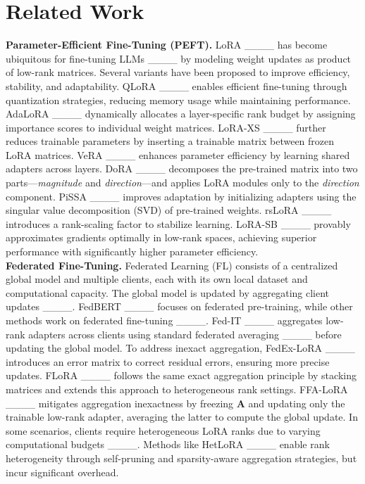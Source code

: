 \section{Related Work}
\textbf{Parameter-Efficient Fine-Tuning (PEFT).}  
LoRA ____ has become ubiquitous for fine-tuning LLMs ____ by modeling weight updates as product of low-rank matrices. 
Several variants have been proposed to improve efficiency, stability, and adaptability.  
QLoRA ____ enables efficient fine-tuning through quantization strategies, reducing memory usage while maintaining performance.  
AdaLoRA ____ dynamically allocates a layer-specific rank budget by assigning importance scores to individual weight matrices.  
LoRA-XS ____ further reduces trainable parameters by inserting a trainable matrix between frozen LoRA matrices.  
VeRA ____ enhances parameter efficiency by learning shared adapters across layers.  
DoRA ____ decomposes the pre-trained matrix into two parts—\textit{magnitude} and \textit{direction}—and applies LoRA modules only to the \textit{direction} component.  
PiSSA ____ improves adaptation by initializing adapters using the singular value decomposition (SVD) of pre-trained weights.  
rsLoRA ____ introduces a rank-scaling factor to stabilize learning.  
LoRA-SB ____ provably approximates gradients optimally in low-rank spaces, achieving superior performance with significantly higher parameter efficiency.
\\

\textbf{Federated Fine-Tuning.}
Federated Learning (FL) consists of a centralized global model and multiple clients, each with its own local dataset and computational capacity. 
The global model is updated by aggregating client updates ____.  
FedBERT ____ focuses on federated pre-training, while other methods work on federated fine-tuning ____.  
Fed-IT ____ aggregates low-rank adapters across clients using standard federated averaging ____ before updating the global model.  
To address inexact aggregation, FedEx-LoRA ____ introduces an error matrix to correct residual errors, ensuring more precise updates.  
FLoRA ____ follows the same exact aggregation principle by stacking matrices and extends this approach to heterogeneous rank settings.  
FFA-LoRA ____ mitigates aggregation inexactness by freezing \( \mathbf{A} \) and updating only the trainable low-rank adapter, averaging the latter to compute the global update.  
In some scenarios, clients require heterogeneous LoRA ranks due to varying computational budgets ____.  
Methods like HetLoRA ____ enable rank heterogeneity through self-pruning and sparsity-aware aggregation strategies, but incur significant overhead.
\\

